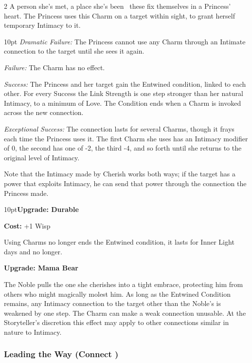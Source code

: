 \begin{multicols}{2}
\noindent A person she's met, a place she's been \textendash\, these fix themselves in a Princess' heart. The Princess uses this Charm on a target within sight, to grant herself temporary Intimacy to it.

   \begin{myindentpar}{10pt} \emph{Dramatic Failure:} The Princess cannot use any Charm through an Intimate connection to the target until she sees it again.
   
    \emph{Failure:} The Charm has no effect.
	
    \emph{Success:} The Princess and her target gain the Entwined condition, linked to each other. For every Success the Link Strength is one step stronger than her natural Intimacy, to a minimum of Love. The Condition ends when a Charm is invoked across the new connection. 
	
    \emph{Exceptional Success:} The connection lasts for several Charms, though it frays each time the Princess uses it. The first Charm she uses has an Intimacy modifier of 0, the second has one of -2, the third -4, and so forth until she returns to the original level of Intimacy.\end{myindentpar}

\noindent Note that the Intimacy made by Cherish works both ways; if the target has a power that exploits Intimacy, he can send that power through the connection the Princess made.

\begin{myindentpar}{10pt}\textbf{Upgrade: Durable}

\noindent \textbf{Cost:} +1 Wisp

\noindent Using Charms no longer ends the Entwined condition, it lasts for Inner Light days and no longer. 

\textbf{Upgrade: Mama Bear}

The Noble pulls the one she cherishes into a tight embrace, protecting him from others who might magically molest him. As long as the Entwined Condition remains, any Intimacy connection to the target other than the Noble’s is weakened by one step. The Charm can make a weak connection unusable. At the Storyteller's discretion this effect may apply to other connections similar in nature to Intimacy.

\end{myindentpar}

\subsubsection*{Leading the Way (Connect \textbullet\textbullet\textbullet)}


\end{multicols}
